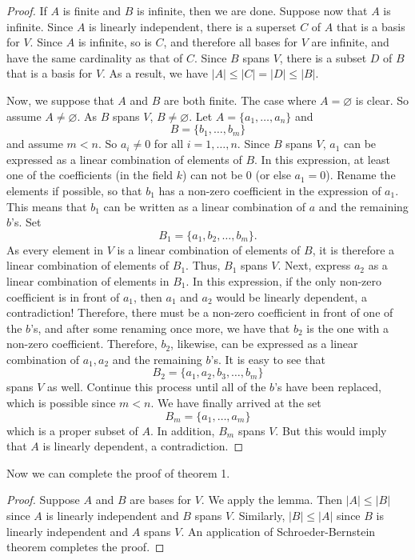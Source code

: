 \documentclass[12pt]{article}
\begin{document}
\begin{proof}
If $A$ is finite and $B$ is infinite, then we are done.  Suppose now that $A$ is infinite.  Since $A$ is linearly independent, there is a superset $C$ of $A$ that is a basis for $V$.  Since $A$ is infinite, so is $C$, and therefore all bases for $V$ are infinite, and have the same cardinality as that of $C$.  Since $B$ spans $V$, there is a subset $D$ of $B$ that is a basis for $V$.  As a result, we have $|A|\le |C|=|D|\le |B|$.

Now, we suppose that $A$ and $B$ are both finite.  The case where $A=\varnothing$ is clear.  So assume $A\ne \varnothing$.  As $B$ spans $V$, $B\ne \varnothing$.  Let $A=\lbrace a_1,\ldots, a_n\rbrace$ and $$B=\lbrace b_1,\ldots, b_m \rbrace$$ and assume $m<n$.  So $a_i\ne 0$ for all $i=1,\ldots, n$.  Since $B$ spans $V$, $a_1$ can be expressed as a linear combination of elements of $B$.  In this expression, at least one of the coefficients (in the field $k$) can not be $0$ (or else $a_1=0$).  Rename the elements if possible, so that $b_1$ has a non-zero coefficient in the expression of $a_1$.  This means that $b_1$ can be written as a linear combination of $a$ and the remaining $b$'s.  Set $$B_1=\lbrace a_1, b_2,\ldots, b_m\rbrace.$$  As every element in $V$ is a linear combination of elements of $B$, it is therefore a linear combination of elements of $B_1$.  Thus, $B_1$ spans $V$.  Next, express $a_2$ as a linear combination of elements in $B_1$.  In this expression, if the only non-zero coefficient is in front of $a_1$, then $a_1$ and $a_2$ would be linearly dependent, a contradiction!  Therefore, there must be a non-zero coefficient in front of one of the $b$'s, and after some renaming once more, we have that $b_2$ is the one with a non-zero coefficient.     Therefore, $b_2$, likewise, can be expressed as a linear combination of $a_1,a_2$ and the remaining $b$'s.  It is easy to see that $$B_2=\lbrace a_1, a_2, b_3, \ldots, b_m\rbrace$$ spans $V$ as well.  Continue this process until all of the $b$'s have been replaced, which is possible since $m<n$.  We have finally arrived at the set $$B_m = \lbrace a_1, \ldots, a_m\rbrace$$ which is a proper subset of $A$.  In addition, $B_m$ spans $V$.  But this would imply that $A$ is linearly dependent, a contradiction.
\end{proof}

Now we can complete the proof of theorem 1.
\begin{proof}  Suppose $A$ and $B$ are bases for $V$.  We apply the lemma.  Then $|A|\le |B|$ since $A$ is linearly independent and $B$ spans $V$.  Similarly, $|B|\le |A|$ since $B$ is linearly independent and $A$ spans $V$.  An application of Schroeder-Bernstein theorem completes the proof.
\end{proof}
\end{document}
